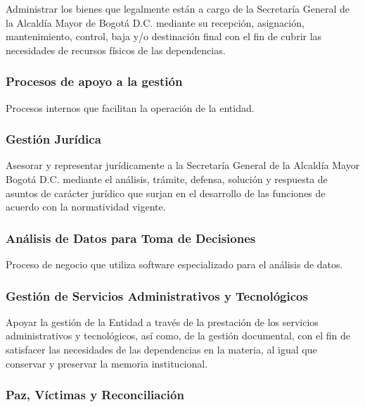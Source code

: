 \documentclass[
	a4paper, %
	12pt, %
]{include/CSSullivanBusinessReport}
\begin{document}
Administrar los bienes que legalmente están a cargo de la Secretaría
General de la Alcaldía Mayor de Bogotá D.C. mediante su recepción,
asignación, mantenimiento, control, baja y/o destinación final con el
fin de cubrir las necesidades de recursos físicos de las dependencias.

\subsubsection{Procesos de apoyo a la
gestión}\label{sec:procesos-de-apoyo-a-la-gestiuxf3n}

Procesos internos que facilitan la operación de la entidad.

\subsubsection{Gestión Jurídica}\label{sec:gestiuxf3n-juruxeddica}

Asesorar y representar jurídicamente a la Secretaría General de la
Alcaldía Mayor Bogotá D.C. mediante el análisis, trámite, defensa,
solución y respuesta de asuntos de carácter jurídico que surjan en el
desarrollo de las funciones de acuerdo con la normatividad vigente.

\subsubsection{Análisis de Datos para Toma de
Decisiones}\label{sec:anuxe1lisis-de-datos-para-toma-de-decisiones}

Proceso de negocio que utiliza software especializado para el análisis
de datos.

\subsubsection{Gestión de Servicios Administrativos y
Tecnológicos}\label{sec:gestiuxf3n-de-servicios-administrativos-y-tecnoluxf3gicos}

Apoyar la gestión de la Entidad a través de la prestación de los
servicios administrativos y tecnológicos, así como, de la gestión
documental, con el fin de satisfacer las necesidades de las dependencias
en la materia, al igual que conservar y preservar la memoria
institucional.

\subsubsection{Paz, Víctimas y
Reconciliación}\label{sec:paz-vuxedctimas-y-reconciliaciuxf3n}
\end{document}
